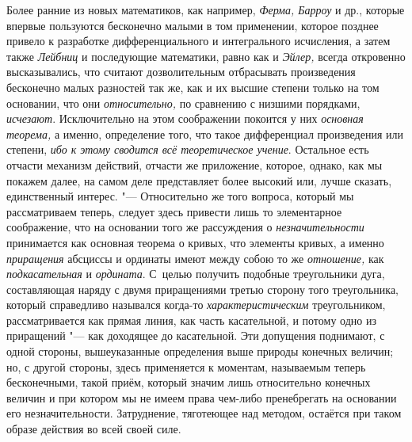 Более ранние из новых математиков, как например, {\em Ферма, Барроу} и
др., которые впервые пользуются бесконечно малыми в том применении, которое
позднее привело к разработке дифференциального и интегрального исчисления, а
затем также {\em Лейбниц} и последующие математики, равно как и {\em Эйлер,}
всегда откровенно высказывались, что считают дозволительным отбрасывать
произведения бесконечно малых разностей так же, как и их высшие степени только
на том основании, что они {\em относительно,} по сравнению с низшими порядками,
{\em исчезают}. Исключительно на этом соображении покоится у них
{\em основная теорема,} а именно, определение того, что такое дифференциал
произведения или степени, {\em ибо к этому сводится всё теоретическое
учение}. Остальное есть отчасти механизм действий, отчасти же приложение,
которое, однако, как мы покажем далее, на самом деле представляет более высокий
или, лучше сказать, единственный интерес. "--- Относительно же того вопроса,
который мы рассматриваем теперь, следует здесь привести лишь то элементарное
соображение, что на основании того же рассуждения о {\em незначительности}
принимается как основная теорема о кривых, что элементы кривых, а именно
{\em приращения} абсциссы и ординаты имеют между собою то же {\em отношение,}
как {\em подкасательная} и {\em ордината}. С~целью получить подобные
треугольники дуга, составляющая наряду с двумя приращениями третью сторону того
треугольника, который справедливо назывался когда-то {\em характеристическим}
треугольником, рассматривается как прямая линия, как часть касательной, и
потому одно из приращений "--- как доходящее до касательной. Эти допущения
поднимают, с одной стороны, вышеуказанные определения выше природы конечных
величин; но, с другой стороны, здесь применяется к моментам, называемым теперь
бесконечными, такой приём, который значим лишь относительно конечных величин и
при котором мы не имеем права чем-либо пренебрегать на основании его
незначительности. Затруднение, тяготеющее над методом, остаётся при таком
образе действия во всей своей силе.

